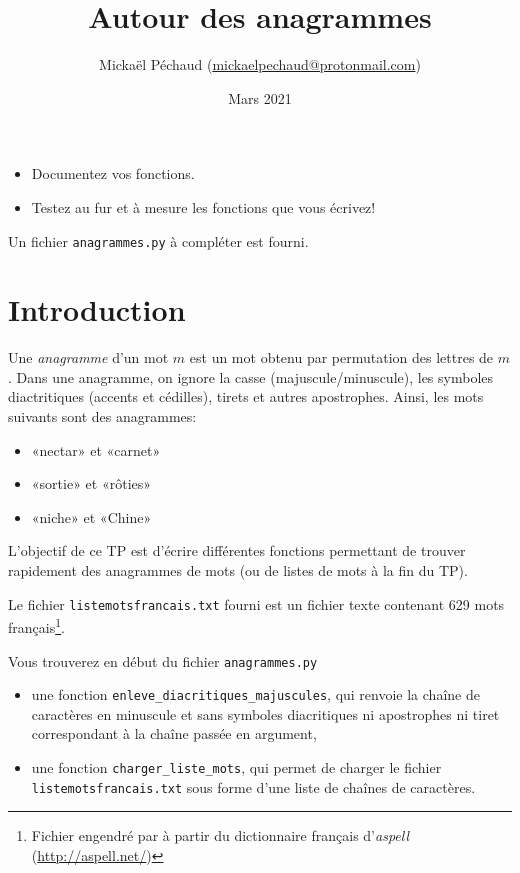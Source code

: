 \documentclass[10pt]{article}
\title{\textbf{Autour des anagrammes}} \date{Mars 2021}
\author{Mickaël Péchaud (\href{mailto:mickaelpechaud@protonmail.com}{mickaelpechaud@protonmail.com})}
\begin{document}
\renewcommand{\labelitemi}{\textbullet}

\maketitle



\begin{itemize}
\item Documentez vos fonctions.
\item Testez au fur et à mesure les fonctions que vous écrivez!
\end{itemize}

Un fichier \verb+anagrammes.py+ à compléter est fourni.

\section{Introduction}

Une \emph{anagramme} d'un mot $m$ est un mot obtenu par permutation des
lettres de $m$. Dans une anagramme, on ignore la casse
(majuscule/minuscule), les symboles diactritiques (accents et
cédilles), tirets et autres apostrophes. Ainsi, les mots suivants sont des anagrammes:

\begin{itemize}
\item «nectar» et «carnet»
\item «sortie» et «rôties»
\item «niche» et «Chine»
\end{itemize}

\smallskip

L'objectif de ce TP est d'écrire différentes fonctions permettant de
trouver rapidement des anagrammes de mots (ou de listes de mots à la
fin du TP).

\smallskip

Le fichier \verb+listemotsfrancais.txt+ fourni est un fichier texte
contenant 629 mots français\footnote{Fichier engendré par à
  partir du dictionnaire français d'\emph{aspell}
  (\url{http://aspell.net/})}.

\smallskip

Vous trouverez en début du fichier \verb+anagrammes.py+

\begin{itemize}
\item une fonction \verb+enleve_diacritiques_majuscules+, qui renvoie la chaîne de caractères en minuscule et sans symboles diacritiques ni apostrophes ni tiret correspondant à la chaîne passée en argument,
\item une fonction \verb+charger_liste_mots+, qui permet de charger le fichier \verb+listemotsfrancais.txt+ sous forme d'une liste de chaînes de caractères. 
\end{itemize}
\end{document}
